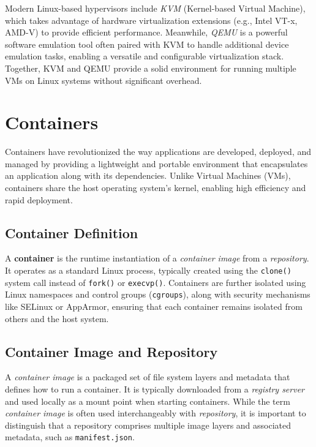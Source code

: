 Modern Linux-based hypervisors include \textit{KVM} (Kernel-based Virtual Machine), which takes advantage of hardware virtualization extensions (e.g., Intel VT-x, AMD-V) to provide efficient performance. Meanwhile, \textit{QEMU} is a powerful software emulation tool often paired with KVM to handle additional device emulation tasks, enabling a versatile and configurable virtualization stack. Together, KVM and QEMU provide a solid environment for running multiple VMs on Linux systems without significant overhead.

\section{Containers}

Containers have revolutionized the way applications are developed, deployed, and managed by providing a lightweight and portable environment that encapsulates an application along with its dependencies. Unlike Virtual Machines (VMs), containers share the host operating system's kernel, enabling high efficiency and rapid deployment.

\subsection{Container Definition}

A \textbf{container} is the runtime instantiation of a \textit{container image} from a \textit{repository}. It operates as a standard Linux process, typically created using the \texttt{clone()} system call instead of \texttt{fork()} or \texttt{execvp()}. Containers are further isolated using Linux namespaces and control groups (\texttt{cgroups}), along with security mechanisms like SELinux or AppArmor, ensuring that each container remains isolated from others and the host system.


\subsection{Container Image and Repository}

A \textit{container image} is a packaged set of file system layers and metadata that defines how to run a container. It is typically downloaded from a \textit{registry server} and used locally as a mount point when starting containers. While the term \textit{container image} is often used interchangeably with \textit{repository}, it is important to distinguish that a repository comprises multiple image layers and associated metadata, such as \texttt{manifest.json}.

